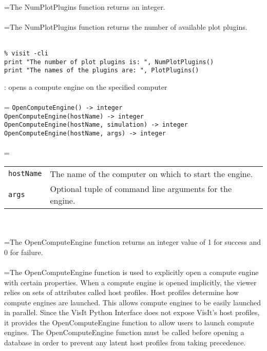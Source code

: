 \documentclass[10pt,a4paper]{report}
\begin{document}
 \\ 
\hangindent=\parindent The NumPlotPlugins function returns an integer. \\[-3mm] 

 \\ 
\hangindent=\parindent The NumPlotPlugins function returns the number of available plot plugins. \\[-3mm] 

\\[-6mm]
\begin{verbatim}% visit -cli
print "The number of plot plugins is: ", NumPlotPlugins()
print "The names of the plugins are: ", PlotPlugins()
\end{verbatim}
\newpage


{}
: opens a compute engine on the specified computer\\[-3mm]

 \\ 
\hangindent=\parindent 
\verb!OpenComputeEngine() -> integer!\\ 
\verb!OpenComputeEngine(hostName) -> integer!\\ 
\verb!OpenComputeEngine(hostName, simulation) -> integer!\\ 
\verb!OpenComputeEngine(hostName, args) -> integer!\\ [-3mm]

 \\ 
\hangindent=\parindent 
\begin{tabular}{lp{9cm}}
\verb!hostName! & The name of the computer on which to start the engine. \\
\verb!args! & Optional tuple of command line arguments for the engine. \\
\end{tabular} \\[-2mm]


 \\ 
\hangindent=\parindent The OpenComputeEngine function returns an integer value of 1 for success and 0 for failure. \\[-3mm] 

 \\ 
\hangindent=\parindent The OpenComputeEngine function is used to explicitly open a compute engine with certain properties. When a compute engine is opened implicitly, the viewer relies on sets of attributes called host profiles. Host profiles determine how compute engines are launched. This allows compute engines to be easily launched in parallel. Since the VisIt Python Interface does not expose VisIt's host profiles, it provides the OpenComputeEngine function to allow users to launch compute engines. The OpenComputeEngine function must be called before opening a database in order to prevent any latent host profiles from taking precedence. \\[-3mm] 
\end{document}
